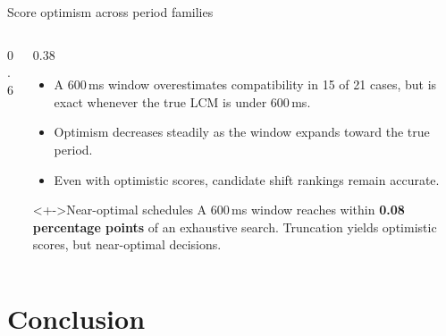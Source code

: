 \documentclass[aspectratio=169,11pt,c]{beamer}
\begin{document}
\begin{frame}{Score optimism across period families}
  \begin{columns}[c]
    \begin{column}{0.6\textwidth}
      \centering
    \end{column}
    \begin{column}{0.38\textwidth}
      \scriptsize
      \begin{itemize}[<+->]
        \item A 600\,ms window overestimates compatibility in 15 of 21 cases, but is exact whenever the true LCM is under 600\,ms.
        \item Optimism decreases steadily as the window expands toward the true period.
        \item Even with optimistic scores, candidate shift rankings remain accurate.
      \end{itemize}
      \vspace{-0.3em}
      \begin{alertblock}<+->{Near-optimal schedules}
        A 600\,ms window reaches within \textbf{0.08 percentage points} of an exhaustive search. Truncation yields optimistic scores, but near-optimal decisions.
      \end{alertblock}
    \end{column}
  \end{columns}
\end{frame}

\section{Conclusion}
\end{document}
